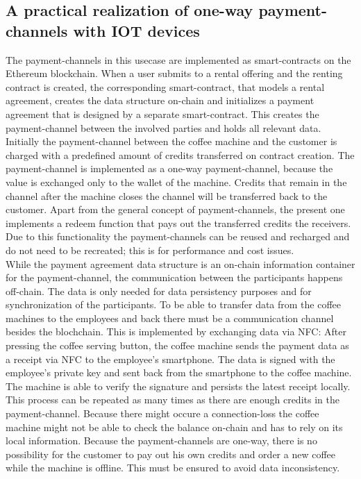 \documentclass[conference]{IEEEtran}
\begin{document}
\subsection{A practical realization of one-way payment-channels with IOT devices}
The payment-channels in this usecase are implemented as smart-contracts on the Ethereum blockchain. When a user submits to a rental offering and the renting contract is created, the corresponding smart-contract, that models a rental agreement, creates the data structure on-chain and initializes a payment agreement that is designed by a separate smart-contract. This creates the payment-channel between the involved parties and holds all relevant data.\\
Initially the payment-channel between the coffee machine and the customer is charged with a predefined amount of credits transferred on contract creation. The payment-channel is implemented as a one-way payment-channel, because the value is exchanged only to the wallet of the machine. Credits that remain in the channel after the machine closes the channel will be transferred back to the customer. Apart from the general concept of payment-channels, the present one implements a redeem function that pays out the transferred credits the receivers. Due to this functionality the payment-channels can be reused and recharged and do not need to be recreated; this is for performance and cost issues.\\
While the payment agreement data structure is an on-chain information container for the payment-channel, the communication between the participants happens off-chain. The data is only needed for data persistency purposes and for synchronization of the participants. To be able to transfer data from the coffee machines to the employees and back there must be a communication channel besides the blochchain. This is implemented by exchanging data via NFC: After pressing the coffee serving button, the coffee machine sends the payment data as a receipt via NFC to the employee's smartphone. The data is signed with the employee's private key and sent back from the smartphone to the coffee machine. The machine is able to verify the signature and persists the latest receipt locally. This process can be repeated as many times as there are enough credits in the payment-channel. Because there might occure a connection-loss the coffee machine might not be able to check the balance on-chain and has to rely on its local information. Because the payment-channels are one-way, there is no possibility for the customer to pay out his own credits and order a new coffee while the machine is offline. This must be ensured to avoid data inconsistency.\\
\end{document}
